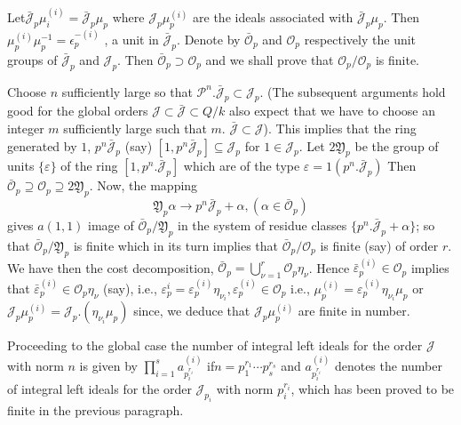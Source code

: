 Let\pageoriginale $\bar{\mathcal{J}}_p \mu_i^{(i)}= \bar{\mathcal{J}}_p \mu_p$ where
$\mathcal{J}_p \mu^{(i)}_p$ are the ideals associated with
$\bar{\mathcal{J}}_p \mu_p$. Then $\mu^{(i)}_p
\mu^{-1}_p=\epsilon^{-(i)}_p$ , a unit in $\bar{\mathcal{J}}_p$. 
Denote by $\bar{\mathscr{O}}_p$ and $\mathscr{O}_p$ respectively the
unit groups of $\bar{\mathcal{J}}_p$ and $\mathcal{J}_p$. Then
$\bar{\mathscr{O}}_p \supset \mathscr{O}_p$ and we shall prove that
$\mathscr{O}_p / \mathscr{O}_p$ is finite.  
 
 Choose $n$ sufficiently large so that $\mathcal{P}^n.
 \bar{\mathcal{J}}_p \subset \mathcal{J}_p$. (The subsequent arguments
 hold good for the global orders $\mathcal{J} \subset
 \bar{\mathcal{J}} \subset Q/k$ also expect that we have to
 choose an integer $m$ sufficiently large such that
 $m$. $\bar{\mathcal{J}} \subset \mathcal{J}$). This implies that the
 ring generated by $1$, $p^n \bar{\mathcal{J}}_p$ (say) $[1, p^n
   \bar{\mathcal{J}}_p] \subseteq \mathcal{J}_p$ for $1 \in
 \mathcal{J}_p$. Let $2 \mathfrak{Y}_p$ be the group of units $\{ \varepsilon
 \}$ of the ring $[1, p^n. \bar{\mathcal{J}}_p]$ which are of the type
 $\varepsilon =1 (p^n. \bar{\mathcal{J}}_p )$ Then
 $\bar{\mathscr{O}}_p \supseteq \mathscr{O}_p \supseteq 2
 \mathfrak{Y}_p$. Now, the mapping 
 $$
 \mathfrak{Y}_p \alpha \to  p^n \bar{\mathcal{J}}_p + \alpha, ( \alpha
 \in \bar{\mathscr{O}}_p) 
 $$
 gives $a(1,1)$ image of $\bar{\mathscr{O}}_p /  \mathfrak{Y}_p$ in
 the system of residue classes $\{p^n. \bar{\mathcal{J}}_p  + \alpha
 \}$; so that $\bar{\mathscr{O}}_p / \mathfrak{Y}_p$ is finite which
 in its turn implies that $\bar{\mathscr{O}}_p / \mathscr{O}_p$ is
 finite  (say) of order $r$. We have then the cost decomposition,
 $\bar{\mathscr{O}}_p= \bigcup\limits^r_{\nu =1} \mathscr{O}_p
 \eta_\nu$. Hence $\bar{\varepsilon}^{(i)}_p \in \mathscr{O}_p$
 implies that $\bar{\varepsilon}^{(i)}_p \in \mathscr{O}_p \eta_{\nu}$
 (say), i.e., $\varepsilon^i_p= \varepsilon^{(i)}_p
 \eta_{\nu_i}, \varepsilon^{(i)}_p \in \mathscr{O}_p$ i.e.,
 $\mu^{(i)}_p = \varepsilon^{(i)}_p \eta_{\nu_i} \mu_p$ or
 $\mathcal{J}_p \mu^{(i)}_p =\mathcal{J}_p. ( \eta_{\nu_i} \mu_p)$
 since, we deduce that $\mathcal{J}_p \mu^{(i)}_p$ are finite in
 number.  
 
 Proceeding to the global case the number of integral left ideals for
 the order $\mathcal{J}$ with norm $n$  is given by
 $\prod\limits_{i=1}^s a^{(i)}_{p_i^{r_i}}$ if\pageoriginale $n=p^{r_1}_1 \cdots
 p^{r_s}_s$ and $a_{p_i^{r_i}}^{(i)}$ denotes the number of integral
 left ideals for the order $\mathcal{J}_{p_i}$ with norm $p_i^{r_i}$,
 which has been proved to be finite in the previous paragraph.  
 
